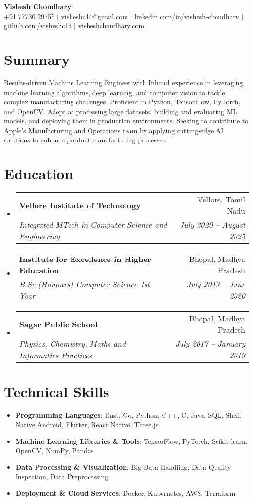 \documentclass[letterpaper,10pt]{article}
\makeatletter
\newcommand{\resumeItem}[1]{\item\small{#1}}
\newcommand{\resumeSubheading}[4]{
\vspace{-1pt}\item
  \begin{tabular*}{0.97\textwidth}[t]{l@{\extracolsep{\fill}}r}
    \textbf{#1} & #2 \\
    \textit{#3} & \textit{#4} \\
  \end{tabular*}\vspace{-7pt}
}
\newcommand{\resumeSubHeadingList}{\begin{itemize}[leftmargin=0.15in, label={}]}
\newcommand{\resumeSubHeadingListEnd}{\end{itemize}}
\makeatother
\begin{document}
\begin{center}
  \textbf{\Huge Vishesh Choudhary} \\
  \small +91 77730 29755 $|$ \href{mailto:visheshc14@gmail.com}{visheshc14@gmail.com} $|$ 
  \href{https://linkedin.com/in/vishesh-choudhary}{linkedin.com/in/vishesh-choudhary} $|$
  \href{https://github.com/visheshc14}{github.com/visheshc14} $|$ 
  \href{https://visheshchoudhary.com}{visheshchoudhary.com}
\end{center}

\section*{Summary}
Results-driven Machine Learning Engineer with Inhand experience in leveraging machine learning algorithms, deep learning, and computer vision to tackle complex manufacturing challenges. Proficient in Python, TensorFlow, PyTorch, and OpenCV. Adept at processing large datasets, building and evaluating ML models, and deploying them in production environments. Seeking to contribute to Apple’s Manufacturing and Operations team by applying cutting-edge AI solutions to enhance product manufacturing processes.

\section{Education}
\resumeSubHeadingList
  \resumeSubheading
      {Vellore Institute of Technology}{Vellore, Tamil Nadu}
      {Integrated MTech in Computer Science and Engineering}{July 2020 -- August 2025}
  \resumeSubheading
        {Institute for Excellence in Higher Education}{Bhopal, Madhya Pradesh}
      {B.Sc (Honours) Computer Science 1st Year}{July 2019 -- June 2020}
  \resumeSubheading
        {Sagar Public School}{Bhopal, Madhya Pradesh}
      {Physics, Chemistry, Maths and Informatics Practices}{July 2017 -- January 2019}
 
\resumeSubHeadingListEnd

\section{Technical Skills}
\resumeSubHeadingList
  \resumeItem{\textbf{Programming Languages}: Rust, Go, Python, C++, C, Java, SQL, Shell, Native Android, Flutter, React Native, Three.js}
  \resumeItem{\textbf{Machine Learning Libraries \& Tools}: TensorFlow, PyTorch, Scikit-learn, OpenCV, NumPy, Pandas}
  \resumeItem{\textbf{Data Processing \& Visualization}: Big Data Handling, Data Quality Inspection, Data Preprocessing}
  \resumeItem{\textbf{Deployment \& Cloud Services}: Docker, Kubernetes, AWS, Terraform}
\resumeSubHeadingListEnd
\end{document}
